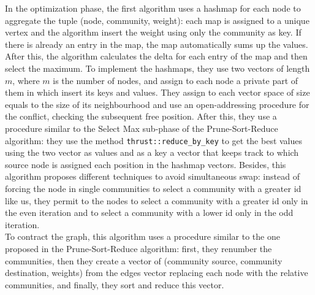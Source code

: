 In the optimization phase, the first algorithm uses a hashmap for each node to aggregate the tuple (node, community, weight): each map is assigned to a unique vertex and the algorithm insert the weight using only the community as key. If there is already an entry in the map, the map automatically sums up the values. After this, the algorithm calculates the delta for each entry of the map and then select the maximum. To implement the hashmaps, they use two vectors of length $m$, where $m$ is the number of nodes, and assign to each node a private part of them in which insert its keys and values. They assign to each vector space of size equals to the size of its neighbourhood and use an open-addressing procedure for the conflict, checking the subsequent free position. 
After this, they use a procedure similar to the Select Max sub-phase of the Prune-Sort-Reduce algorithm: 
they use the method \verb|thrust::reduce_by_key| to get the best values using the two vector as values and as a key a vector that keeps track to which source node is assigned each position in the hashmap vectors. Besides, this algorithm proposes different techniques to avoid simultaneous swap: instead of forcing the node in single communities to select a community with a greater id like us, they permit to the nodes to select a community with a greater id only in the even iteration and to select a community with a lower id only in the odd iteration. \\
To contract the graph, this algorithm uses a procedure similar to the one proposed in the Prune-Sort-Reduce algorithm: first, they renumber the communities, then they create a vector of (community source, community destination, weights) from the edges vector replacing each node with the relative communities, and finally, they sort and reduce this vector.

